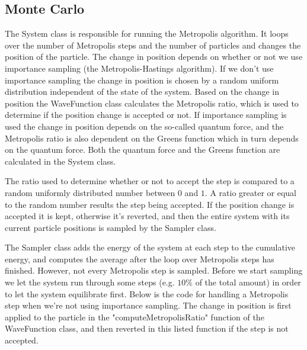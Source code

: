 \documentclass[../main.tex]{subfiles}
\begin{document}
\subsection{Monte Carlo}

The System class is responsible for running the Metropolis algorithm. It loops over the number of Metropolis steps and the number of particles and changes the position of the particle. The change in position depends on whether or not we use importance sampling (the Metropolis-Hastings algorithm). If we don't use importance sampling the change in position is chosen by a random uniform distribution independent of the state of the system. Based on the change in position the WaveFunction class calculates the Metropolis ratio, which is used to determine if the position change is accepted or not. If importance sampling is used the change in position depends on the so-called quantum force, and the Metropolis ratio is also dependent on the Greens function which in turn depends on the quantum force. Both the quantum force and the Greens function are calculated in the System class. 

The ratio used to determine whether or not to accept the step is compared to a random uniformly distributed number between $0$ and $1$. A ratio greater or equal to the random number results the step being accepted. If the position change is accepted it is kept, otherwise it's reverted, and then the entire system with its current particle positions is sampled by the Sampler class. 

The Sampler class adds the energy of the system at each step to the cumulative energy, and computes the average after the loop over Metropolis steps has finished. However, not every Metropolis step is sampled. Before we start sampling we let the system run through some steps (e.g. $10\%$ of the total amount) in order to let the system equilibrate first. Below is the code for handling a Metropolis step when we're not using importance sampling. The change in position is first applied to the particle in the "computeMetropolisRatio" function of the WaveFunction class, and then reverted in this listed function if the step is not accepted.
\end{document}

